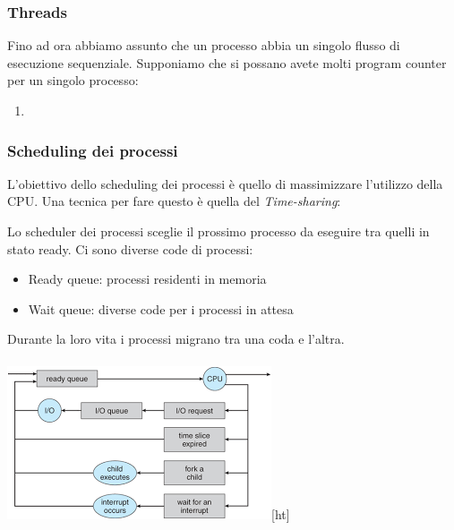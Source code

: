 \documentclass[11pt]{article}
\begin{document}
\subsubsection{Threads}
Fino ad ora abbiamo assunto che un processo abbia un singolo flusso di esecuzione sequenziale. Supponiamo che si possano avete molti program counter per un singolo processo:
\begin{enumerate}
\item 
\end{enumerate}

\subsubsection{Scheduling dei processi}
L'obiettivo dello scheduling dei processi è quello di massimizzare l'utilizzo della CPU. Una tecnica per fare questo è quella del \emph{Time-sharing}:

Lo scheduler dei processi sceglie il prossimo processo da eseguire tra quelli in stato ready.
Ci sono diverse code di processi:
\begin{itemize}
 \item Ready queue: processi residenti in memoria
\item Wait queue: diverse code per i processi in attesa
\end{itemize}
Durante la loro vita i processi migrano tra una coda e l'altra.
\\ \\
\includegraphics[scale=1.1]{processQueue.png}[ht]
\\ \\
\end{document}
